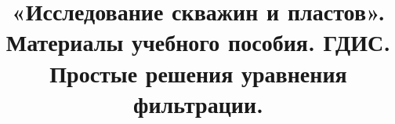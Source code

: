 \documentclass{article}
\begin{document}
\title{«Исследование скважин и пластов». Материалы учебного пособия. ГДИС. Простые решения уравнения фильтрации.}

\maketitle


\tableofcontents{}





\printbibliography
\end{document}
